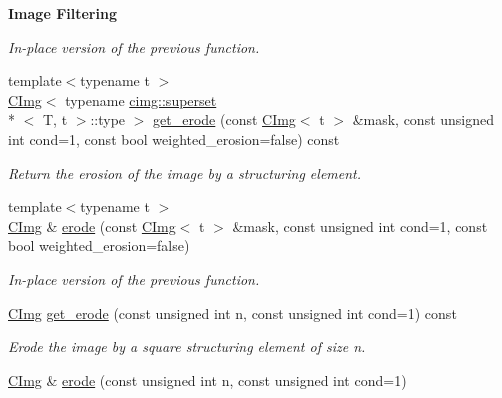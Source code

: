 \begin{Indent}{\bf Image Filtering}
\begin{DoxyCompactItemize}
\begin{DoxyCompactList}\small\item\em In-\/place version of the previous function. \end{DoxyCompactList}\item 
\hypertarget{structcimg__library_1_1_c_img_a6937993b35e8ed4d10638a14a6cc95a5}{{\footnotesize template$<$typename t $>$ }\\\hyperlink{structcimg__library_1_1_c_img}{C\-Img}$<$ typename \hyperlink{structcimg__library_1_1cimg_1_1superset}{cimg\-::superset}\\*
$<$ T, t $>$\-::type $>$ \hyperlink{structcimg__library_1_1_c_img_a6937993b35e8ed4d10638a14a6cc95a5}{get\-\_\-erode} (const \hyperlink{structcimg__library_1_1_c_img}{C\-Img}$<$ t $>$ \&mask, const unsigned int cond=1, const bool weighted\-\_\-erosion=false) const }\label{structcimg__library_1_1_c_img_a6937993b35e8ed4d10638a14a6cc95a5}

\begin{DoxyCompactList}\small\item\em Return the erosion of the image by a structuring element. \end{DoxyCompactList}\item 
\hypertarget{structcimg__library_1_1_c_img_a82146668c6b9c66f3f4bb9542f9766e1}{{\footnotesize template$<$typename t $>$ }\\\hyperlink{structcimg__library_1_1_c_img}{C\-Img} \& \hyperlink{structcimg__library_1_1_c_img_a82146668c6b9c66f3f4bb9542f9766e1}{erode} (const \hyperlink{structcimg__library_1_1_c_img}{C\-Img}$<$ t $>$ \&mask, const unsigned int cond=1, const bool weighted\-\_\-erosion=false)}\label{structcimg__library_1_1_c_img_a82146668c6b9c66f3f4bb9542f9766e1}

\begin{DoxyCompactList}\small\item\em In-\/place version of the previous function. \end{DoxyCompactList}\item 
\hypertarget{structcimg__library_1_1_c_img_aca876e6dbc38df15c944ee60903742ef}{\hyperlink{structcimg__library_1_1_c_img}{C\-Img} \hyperlink{structcimg__library_1_1_c_img_aca876e6dbc38df15c944ee60903742ef}{get\-\_\-erode} (const unsigned int n, const unsigned int cond=1) const }\label{structcimg__library_1_1_c_img_aca876e6dbc38df15c944ee60903742ef}

\begin{DoxyCompactList}\small\item\em Erode the image by a square structuring element of size n. \end{DoxyCompactList}\item 
\hypertarget{structcimg__library_1_1_c_img_a694d451f82c9532088ff0906d427e343}{\hyperlink{structcimg__library_1_1_c_img}{C\-Img} \& \hyperlink{structcimg__library_1_1_c_img_a694d451f82c9532088ff0906d427e343}{erode} (const unsigned int n, const unsigned int cond=1)}\label{structcimg__library_1_1_c_img_a694d451f82c9532088ff0906d427e343}


\end{DoxyCompactItemize}
\end{Indent}
